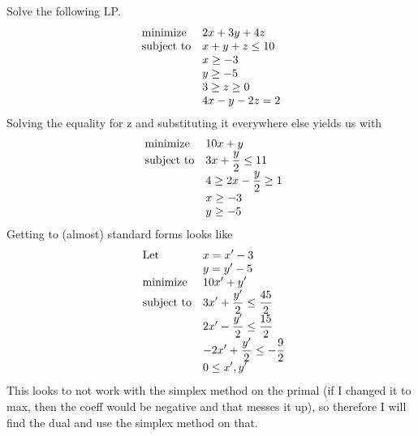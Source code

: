 \documentclass[12pt]{article}
\newenvironment{exercise}[2][Exercise]{\begin{trivlist}
		\item[\hskip \labelsep {\bfseries #1}\hskip \labelsep {\bfseries #2.}]}{\end{trivlist}}
\begin{document}
	\begin{exercise}{3} Solve the following LP.
		\begin{equation*}
			\begin{array}{ll@{}ll}
				\text{minimize}  & \displaystyle 2x+3y+4z &\\
				\text{subject to}& \displaystyle x + y + z \leq 10   \\
				& \displaystyle x \geq -3 \\
				& \displaystyle y \geq -5 \\
				& \displaystyle 3 \geq z \geq 0 \\
				& \displaystyle 4x - y - 2z = 2 \\
			\end{array}
		\end{equation*}
		Solving the equality for z and substituting it everywhere else yields us with
		\begin{equation*}
			\begin{array}{ll@{}ll}
				\text{minimize}  & \displaystyle 10x+y \\
				\text{subject to}& \displaystyle 3x + \frac{y}{2} \leq 11 \\
				& \displaystyle 4 \geq 2x-\frac{y}{2} \geq 1 \\
				& \displaystyle x \geq -3 \\
				& \displaystyle y \geq -5 \\
			\end{array}
		\end{equation*}
		Getting to (almost) standard forms looks like
		\begin{equation*}
			\begin{array}{ll@{}ll}
				\text{Let} &\displaystyle x=x'-3\\
				&\displaystyle y=y'-5\\
				\text{minimize}  & \displaystyle 10x'+y' \\
				\text{subject to}& \displaystyle 3x'+ \frac{y'}{2} \leq \frac{45}{2} \\
				& \displaystyle 2x' -\frac{y'}{2} \leq \frac{15}{2} \\
				& \displaystyle -2x' +\frac{y'}{2}\leq -\frac{9}{2} \\
				& \displaystyle 0 \leq x',y' \\
			\end{array}
		\end{equation*}
		This looks to not work with the simplex method on the primal (if I changed it to max, then the coeff would be negative and that messes it up), so therefore I will find the dual and use the simplex method on that.\\

\end{exercise}
\end{document}
